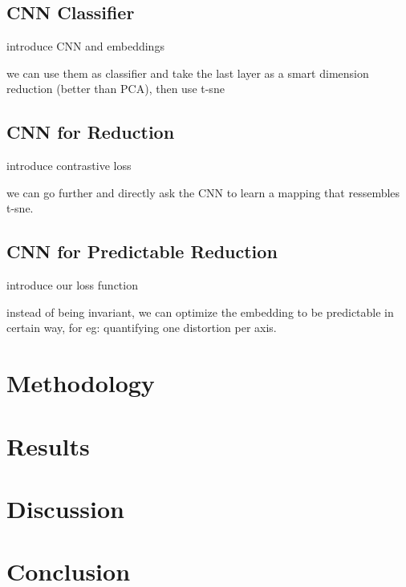 \documentclass[a4paper,12pt]{report}
\begin{document}
\section{CNN Classifier}
introduce CNN and embeddings

we can use them as classifier and take the last layer as a smart dimension reduction (better than PCA), then use t-sne

\section{CNN for Reduction}
introduce contrastive loss

we can go further and directly ask the CNN to learn a mapping that ressembles t-sne.

\section{CNN for Predictable Reduction}
introduce our loss function

instead of being invariant, we can optimize the embedding to be predictable in certain way, for eg: quantifying one distortion per axis.

\chapter{Methodology}

\chapter{Results}

\chapter{Discussion}

\chapter{Conclusion}

\end{document}
